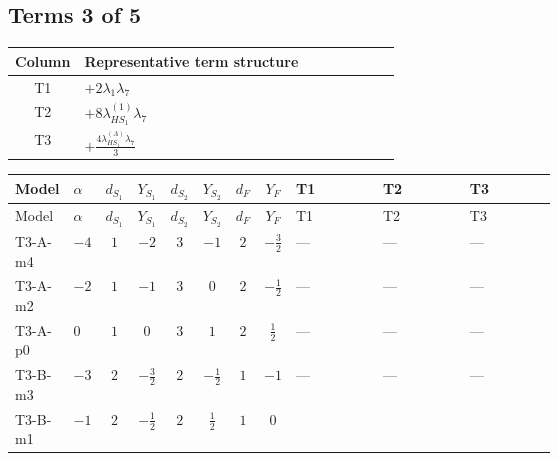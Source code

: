 \documentclass[8pt]{article}
\begin{document}
\begin{landscape}
\subsection*{Terms 3 of 5}
\begin{center}
\begin{tabular}{@{}c >{\raggedright\arraybackslash}p{0.82\linewidth}@{}}
\toprule
Column & Representative term structure \\
\midrule
T1 & \(\displaystyle +2 {\lambda_1} {\lambda_{7}}\) \\
\midrule
T2 & \(\displaystyle +8 {\lambda_{HS_1}^{(1)}} {\lambda_{7}}\) \\
\midrule
T3 & \(\displaystyle +\frac{4 {\lambda_{HS_1}^{(A)}} {\lambda_{7}}}{3}\) \\
\midrule
\bottomrule
\end{tabular}
\end{center}
\smallskip
\tiny
\begin{longtable}{@{}llcccccc >{\raggedright\arraybackslash}p{0.21\linewidth} >{\raggedright\arraybackslash}p{0.21\linewidth} >{\raggedright\arraybackslash}p{0.21\linewidth}@{}}
\toprule
Model & $\alpha$ & $d_{S_1}$ & $Y_{S_1}$ & $d_{S_2}$ & $Y_{S_2}$ & $d_F$ & $Y_F$ & T1 & T2 & T3 \\
\midrule
\endfirsthead
\toprule
Model & $\alpha$ & $d_{S_1}$ & $Y_{S_1}$ & $d_{S_2}$ & $Y_{S_2}$ & $d_F$ & $Y_F$ & T1 & T2 & T3 \\
\midrule
\endhead
T3-A-m4 & $-4$ & $1$ & $-2$ & $3$ & $-1$ & $2$ & $-\frac{3}{2}$ & --- & --- & --- \\
\midrule
T3-A-m2 & $-2$ & $1$ & $-1$ & $3$ & $0$ & $2$ & $-\frac{1}{2}$ & --- & --- & --- \\
\midrule
T3-A-p0 & $0$ & $1$ & $0$ & $3$ & $1$ & $2$ & $\frac{1}{2}$ & --- & --- & --- \\
\midrule
T3-B-m3 & $-3$ & $2$ & $-\frac{3}{2}$ & $2$ & $-\frac{1}{2}$ & $1$ & $-1$ & --- & --- & --- \\
\midrule
T3-B-m1 & $-1$ & $2$ & $-\frac{1}{2}$ & $2$ & $\frac{1}{2}$ & $1$ & $0$ & \scriptsize\adjustbox{max width=\linewidth}{$\begin{gathered} +2 {\lambda_1} {\lambda_{7}}\end{gathered}$} & \scriptsize\adjustbox{max width=\linewidth}{$\begin{gathered} +8 {\lambda_{HS_1}^{(1)}} {\lambda_{7}}\end{gathered}$} & \scriptsize\adjustbox{max width=\linewidth}{$\begin{gathered} +\frac{4 {\lambda_{HS_1}^{(A)}} {\lambda_{7}}}{3}\end{gathered}$} \\

\end{longtable}
\end{landscape}
\end{document}
